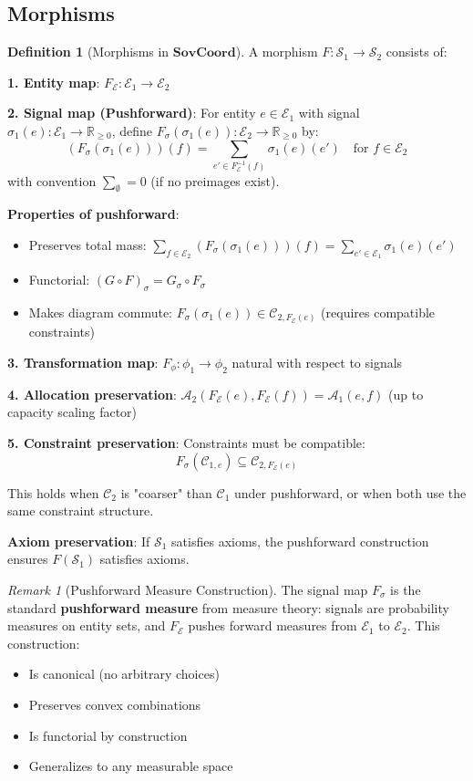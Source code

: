 \documentclass[11pt,a4paper]{article}
\theoremstyle{definition}
\newtheorem{definition}[theorem]{Definition}
\theoremstyle{remark}
\newtheorem{remark}[theorem]{Remark}
\newcommand{\E}{\mathcal{E}}
\newcommand{\A}{\mathcal{A}}
\newcommand{\C}{\mathcal{C}}
\newcommand{\SovCoord}{\mathbf{SovCoord}}
\begin{document}
\subsection{Morphisms}

\begin{definition}[Morphisms in $\SovCoord$]
A morphism $F: \mathcal{S}_1 \to \mathcal{S}_2$ consists of:

\textbf{1. Entity map}: $F_\E: \E_1 \to \E_2$

\textbf{2. Signal map (Pushforward)}: For entity $e \in \E_1$ with signal $\sigma_1(e): \E_1 \to \mathbb{R}_{\ge 0}$, define $F_\sigma(\sigma_1(e)): \E_2 \to \mathbb{R}_{\ge 0}$ by:
\[ (F_\sigma(\sigma_1(e)))(f) = \sum_{e' \in F_\E^{-1}(f)} \sigma_1(e)(e') \quad \text{for } f \in \E_2 \]
with convention $\sum_{\emptyset} = 0$ (if no preimages exist).

\textbf{Properties of pushforward}:
\begin{itemize}
\item Preserves total mass: $\sum_{f \in \E_2} (F_\sigma(\sigma_1(e)))(f) = \sum_{e' \in \E_1} \sigma_1(e)(e')$
\item Functorial: $(G \circ F)_\sigma = G_\sigma \circ F_\sigma$
\item Makes diagram commute: $F_\sigma(\sigma_1(e)) \in \C_{2,F_\E(e)}$ (requires compatible constraints)
\end{itemize}

\textbf{3. Transformation map}: $F_\phi: \phi_1 \to \phi_2$ natural with respect to signals

\textbf{4. Allocation preservation}: $\A_2(F_\E(e), F_\E(f)) = \A_1(e,f)$ (up to capacity scaling factor)

\textbf{5. Constraint preservation}: Constraints must be compatible:
\[ F_\sigma(\C_{1,e}) \subseteq \C_{2,F_\E(e)} \]

This holds when $\C_2$ is "coarser" than $\C_1$ under pushforward, or when both use the same constraint structure.

\textbf{Axiom preservation}: If $\mathcal{S}_1$ satisfies axioms, the pushforward construction ensures $F(\mathcal{S}_1)$ satisfies axioms.
\end{definition}

\begin{remark}[Pushforward Measure Construction]
The signal map $F_\sigma$ is the standard \textbf{pushforward measure} from measure theory: signals are probability measures on entity sets, and $F_\E$ pushes forward measures from $\E_1$ to $\E_2$. This construction:
\begin{itemize}
\item Is canonical (no arbitrary choices)
\item Preserves convex combinations
\item Is functorial by construction
\item Generalizes to any measurable space
\end{itemize}
\end{remark}
\end{document}

